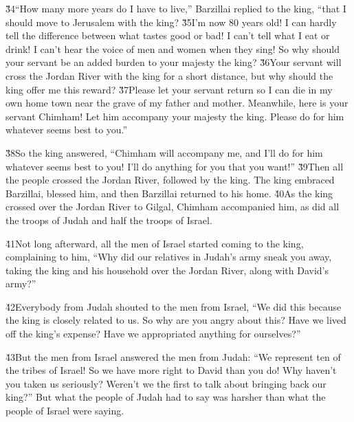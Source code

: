 \v{34}``How many more years do I have to live,'' Barzillai replied to the king, ``that I should move to Jerusalem with the king? \v{35}I'm now 80 years old! I can hardly tell the difference between what tastes good or bad! I can't tell what I eat or drink! I can't hear the voice of men and women when they sing! So why should your servant be an added burden to your majesty the king? \v{36}Your servant will cross the Jordan River with the king for a short distance, but why should the king offer me this reward? \v{37}Please let your servant return so I can die in my own home town near the grave of my father and mother. Meanwhile, here is your servant Chimham! Let him accompany your majesty the king. Please do for him whatever seems best to you.''

\v{38}So the king answered, ``Chimham will accompany me, and I'll do for him whatever seems best to you! I'll do anything for you that you want!'' \v{39}Then all the people crossed the Jordan River, followed by the king. The king embraced Barzillai, blessed him, and then Barzillai returned to his home. \v{40}As the king crossed over the Jordan River to Gilgal, Chimham accompanied him, as did all the troops of Judah and half the troops of Israel.

\v{41}Not long afterward, all the men of Israel started coming to the king, complaining to him, ``Why did our relatives in Judah's army sneak you away, taking the king and his household over the Jordan River, along with David's army?''

\v{42}Everybody from Judah shouted to the men from Israel, ``We did this because the king is closely related to us. So why are you angry about this? Have we lived off the king's expense? Have we appropriated anything for ourselves?''

\v{43}But the men from Israel answered the men from Judah: ``We represent ten of the tribes of Israel! So we have more right to David than you do! Why haven't you taken us seriously? Weren't we the first to talk about bringing back our king?'' But what the people of Judah had to say was harsher than what the people of Israel were saying.

